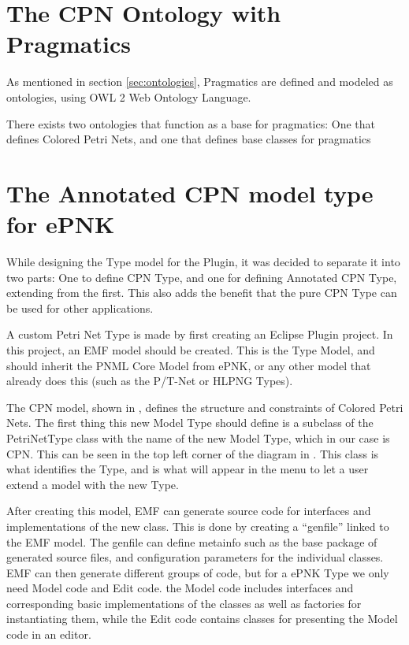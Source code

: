 \section{The CPN Ontology with Pragmatics}
As mentioned in section \ref{sec:ontologies}, Pragmatics are defined and modeled
as ontologies, using OWL 2 Web Ontology Language.  

There exists two ontologies that function as a base for pragmatics: One that
defines Colored Petri Nets, and one that defines base classes for pragmatics


\section{The Annotated CPN model type for ePNK}
While designing the Type model for the Plugin, it was decided to separate it
into two parts: One to define CPN Type, and one for defining Annotated CPN Type,
extending from the first. This also adds the benefit that the pure CPN Type can
be used for other applications.

A custom Petri Net Type is made by first creating an Eclipse Plugin project. 
In this project, an EMF model should be created. This is the Type Model, and
should inherit the PNML Core Model from ePNK, or any other model that already
does this (such as the P/T-Net or HLPNG Types). 

The CPN model, shown in , defines the structure and
constraints of Colored Petri Nets. The first thing this new Model Type should
define is a subclass of the PetriNetType class with the name of the new Model
Type, which in our case is CPN. This can be seen in the top left corner of the
diagram in . This class is what identifies the Type,
and is what will appear in the menu to let a user extend a model with the new
Type.

After creating this model, EMF can generate source code for interfaces and
implementations of the new class. This is done by creating a ``genfile''
linked to the EMF model. The genfile can define metainfo such as the base
package of generated source files, and configuration parameters for the
individual classes. EMF can then generate different groups of code, but for a
ePNK Type we only need Model code and Edit code. the Model code includes
interfaces and corresponding basic implementations of the classes as well as
factories for instantiating them, while the Edit code contains classes for
presenting the Model code in an editor.

